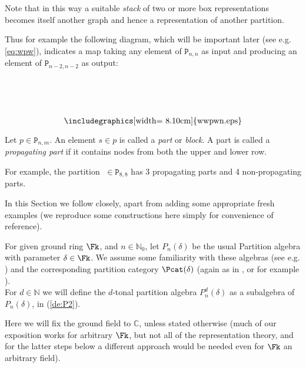 \documentclass[reqno,10pt,a4paper]{amsart}
\newcommand{\C}{\mathbb{C}}
\newcommand{\N}{\mathbb{N}}
\newcommand{\rb}[2]{\raisebox{#1}{#2}}
\newcommand{\ig}{\includegraphics}
\newcommand{\beq}{\begin{equation}}
\newcommand{\eq}{\end{equation}}
\newcommand{\blue}[1]{\textcolor{blue}{#1}}
\newcommand{\red}[1]{\textcolor{red}{#1}}
\newcommand{\ppm}[1]{\red{#1}}
\newcommand{\ca}[1]{\blue{#1}}
\newcommand{\nk}{n}  %
\newcommand{\dl}{d}  %
\newcommand{\PP}{P_\nk^\dl(\delta)} %
\newcommand{\ignore}[1]{}
\newcommand{\rmP}{{\mathtt P}} %
\begin{document}
\ignore{ 
We can even allow some representative graphs with additional vertices 
drawn in the interior of the box, so long as the connections among 
$\underline{n} \cup \underline{m'} $  are correct. 
}

\mdef  \label{de:Pcomposition}
Note that in this way a suitable {\em stack} of two 
or more
box representations 
becomes itself another graph and hence a  
representation of another partition. 

Thus for example the following diagram, 
which will be important later (see e.g. \eqref{eq:wpw}), 
indicates a map taking any element of 
$\rmP_{n,n}$ as input and producing an element of $\rmP_{n-2,n-2}$ as output: 

\beq \label{eq:wpw0} 
\rb{-.6422in}{\ig[width= 8.10cm]{wwpwn.eps}}
\eq 


\mdef 
Let $p\in\rmP_{\nk,m}$. 
An element $s\in p$ is called a {\em part} or {\em block}.
A part is called a {\em propagating part} if it 
contains  %
nodes from both the upper and lower row. 

For example, the partition 
\rb{-.21in}{\ig[width=3.5cm]{exapropag.eps}}$\;\in\rmP_{8,8}$ 
has 3 propagating parts and 4 non-propagating parts.

\medskip 

In this Section we follow    %
\cite{amm2019tonal} 
closely,   %
apart from adding some appropriate fresh examples
(we reproduce some constructions here simply for convenience of reference).


\medskip 

\mdef  \label{de:Pn}
For given ground %
ring $\Fk$,
and $\nk \in \N_0$, 
let $P_\nk(\delta)$ be the usual Partition algebra with parameter $\delta \in \Fk$.
We assume 
some 
familiarity with these algebras (see e.g. \cite{Martin94,Halverson05})
and the corresponding partition category $\Pcat(\delta)$ 
(again as in \cite{Martin94}, or for example \cite{Martin08a}).
\\ 
For $d \in \N$ 
we will define the $d$-tonal partition algebra $\PP$ as a subalgebra 
of $P_\nk(\delta)$, in (\ref{de:P2}).

Here we will fix the ground field to $\C$,
unless stated otherwise
(much of our exposition works for arbitrary $\Fk$, 
but not all of the representation theory, 
and for the latter steps below a different approach would be needed even for $\Fk$  an arbitrary field).
\end{document}
